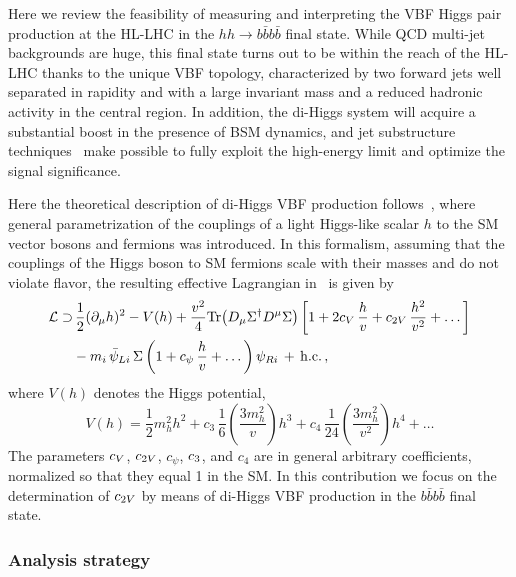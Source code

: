 Here we review the feasibility of measuring and interpreting
the VBF Higgs pair production at the HL-LHC in
 the $hh\to b\bar{b}b\bar{b}$ final state.
 While QCD multi-jet backgrounds are huge, this final state turns out
 to be within the reach of the HL-LHC thanks to the unique VBF topology,
characterized by two forward jets well separated in rapidity and with a large
invariant mass and a reduced hadronic activity in the central region. 
In addition, the di-Higgs system will acquire a substantial boost
in the presence of BSM dynamics, and jet
substructure techniques~\cite{Salam:2009jx,Gouzevitch:2013qca,Behr:2015oqq} 
make possible to fully exploit the
high-energy limit and optimize the signal significance.

Here the theoretical description of di-Higgs VBF production follows~\cite{Contino:2010mh}, where general parametrization of the
couplings of a light Higgs-like scalar $h$ to the SM vector bosons and fermions
was introduced.
%
In this formalism, assuming that the couplings of the Higgs boson to SM fermions scale with their masses and
do not violate flavor, the resulting effective Lagrangian in~\cite{Contino:2010mh}
is given by
\begin{equation}
\label{eq:lagrangian}
\begin{split}
{\cal L}  \supset
 & \, \frac{1}{2}(\partial_\mu h)^2 - V(h) +\frac{v^2}{4}{\rm Tr}\!\left (D_\mu \Sigma^\dagger D^\mu \Sigma\right )
    \left [ 1+2c_V\, \frac{h}{v}+c_{2V}\,\frac{h^2}{v^2}+\dots\right ] \\
 &-m_i\,\bar \psi_{Li}\, \Sigma\left (1+c_{\psi}\,\frac{h}{v} + \dots \right)\psi_{Ri}\,+\,{\rm h.c.}\, ,
\end{split}
\end{equation}
%
where $V(h)$ denotes the Higgs potential, 
%
\begin{equation}
\label{eq:potential}
V(h) = \frac{1}{2} m_h^2 h^2 + c_3\, \frac{1}{6} \left( \frac{3m_h^2}{v} \right) h^3 + c_4\, \frac{1}{24} \left( \frac{3m_h^2}{v^2} \right) h^4 + \dots
\end{equation}
%
The parameters $c_V$, $c_{2V}$, $c_{\psi}$, $c_3$, and $c_4$ are in general
arbitrary coefficients, normalized so that they equal 1 in the SM.
%
In this contribution we focus on the determination of $c_{2V}$ by means
of di-Higgs VBF production in the $b\bar{b}b\bar{b}$ final state.

\subsubsection{Analysis strategy}

